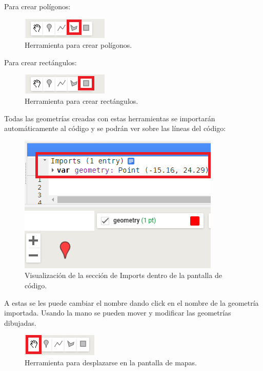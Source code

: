 \documentclass[
  12pt,
  letterpaper,
  twoside]{book}
\begin{document}
Para crear polígonos:

\begin{figure}

{\centering \includegraphics[width=0.2\linewidth]{Img/poligono} 

}

\caption{Herramienta para crear polígonos.}\label{fig:unnamed-chunk-56}
\end{figure}

Para crear rectángulos:

\begin{figure}

{\centering \includegraphics[width=0.2\linewidth]{Img/rec} 

}

\caption{Herramienta para crear rectángulos.}\label{fig:unnamed-chunk-57}
\end{figure}

Todas las geometrías creadas con estas herramientas se importarán automáticamente al código y se podrán ver sobre las líneas del código:

\begin{figure}

{\centering \includegraphics[width=0.5\linewidth]{Img/import} 

}

\caption{Visualización de la sección de Imports dentro de la pantalla de código.}\label{fig:unnamed-chunk-58}
\end{figure}

A estas se les puede cambiar el nombre dando click en el nombre de la geometría importada.
Usando la mano se pueden mover y modificar las geometrías dibujadas.

\begin{figure}

{\centering \includegraphics[width=0.2\linewidth]{Img/mano} 

}

\caption{Herramienta para desplazarse en la pantalla de mapas.}\label{fig:unnamed-chunk-59}
\end{figure}
\end{document}
